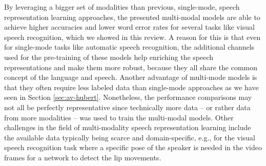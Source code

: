 By leveraging a bigger set of modalities than previous, single-mode, speech representation learning approaches, the presented multi-modal models are able to achieve higher accuracies and lower word error rates for several tasks like visual speech recognition, which we showed in this review. A reason for this is that even for single-mode tasks like automatic speech recognition, the additional channels used for the pre-training of these models help enriching the speech representations and make them more robust, because they all share the common concept of the language and speech. Another advantage of multi-mode models is that they often require less labeled data than single-mode approaches as we have seen in Section \ref{sec:av-hubert}. Nonetheless, the performance comparisons may not all be perfectly representative since technically more data -- or rather data from more modalities -- was used to train the multi-modal models. Other challenges in the field of multi-modality speech representation learning include the available data typically being scarce and domain-specific, e.g., for the visual speech recognition task where a specific pose of the speaker is needed in the video frames for a network to detect the lip movements.